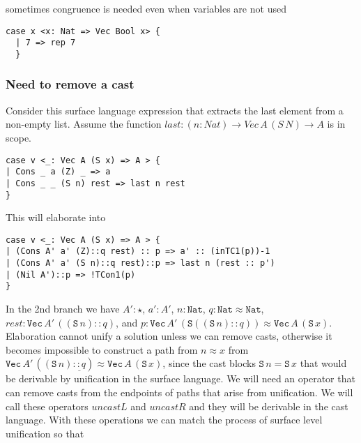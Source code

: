 
sometimes congruence is needed even when variables are not used

\begin{lstlisting}[basicstyle={\ttfamily\small}]
  case x <x: Nat => Vec Bool x> {
  | 7 => rep 7
  }
  \end{lstlisting}


\subsubsection{Need to remove a cast}

Consider this surface language expression that extracts the last element from a non-empty list.
Assume the function $last:(n:Nat)\rightarrow Vec\,A\,(S\,N)\rightarrow A$ is in scope.

\begin{lstlisting}[basicstyle={\ttfamily\small}]
case v <_: Vec A (S x) => A > {
| Cons _ a (Z) _ => a
| Cons _ _ (S n) rest => last n rest
}
\end{lstlisting}

This will elaborate into 

\begin{lstlisting}[basicstyle={\ttfamily\small}]
case v <_: Vec A (S x) => A > {
| (Cons A' a' (Z)::q rest) :: p => a' :: (inTC1(p))-1
| (Cons A' a' (S n)::q rest)::p => last n (rest :: p')
| (Nil A')::p => !TCon1(p)
}
\end{lstlisting}


In the 2nd branch we have
  $A':\star$, $a':A'$, $n:\mathtt{Nat}$,
  $q:\mathtt{Nat}\approx \mathtt{Nat}$,
  $rest:\mathtt{Vec}\,A'\,\left(\left(\mathtt{S}\,n\right)::q\right)$,
  and $p:\mathtt{Vec}\,A'\,\left(\mathtt{S}\left(\left(\mathtt{S}\,n\right)::q\right)\right)\approx \mathtt{Vec}\,A\,\left(\mathtt{S}\,x\right)$.
Elaboration cannot unify a solution unless we can remove casts, otherwise it becomes impossible to construct a path from $n \approx x$
  from $\mathtt{Vec}\,A'\,\left(\left(\mathtt{S}\,n\right)\underline{::q}\right)\approx \mathtt{Vec}\,A\,\left(\mathtt{S}\,x\right)$, since the cast blocks
  $\mathtt{S}\,n = \mathtt{S}\,x$ that would be derivable by unification in the surface language.
We will need an operator that can remove casts from the endpoints of paths that arise from unification.
We will call these operators $uncastL$ and $uncastR$ and they will be derivable in the cast language.
With these operations we can match the process of surface level unification so that

